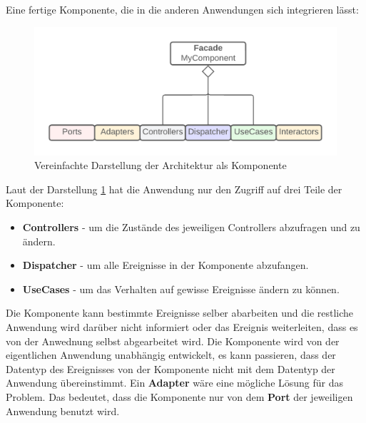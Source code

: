 Eine fertige Komponente, die in die anderen Anwendungen sich integrieren lässt:

\begin{figure}[H]
    \centering
    \includegraphics[width=1\textwidth]{./images/Architecture as Facade.png}
    \caption{Vereinfachte Darstellung der Architektur als Komponente}
    \label{fig:SimpliedArchitectureAsKomponent}
\end{figure}

Laut der Darstellung \ref{fig:SimpliedArchitectureAsKomponent} hat die Anwendung nur den Zugriff auf drei Teile der Komponente:
\begin{itemize}
    \item \textbf{Controllers} - um die Zustände des jeweiligen Controllers abzufragen und zu ändern.
    \item \textbf{Dispatcher} - um alle Ereignisse in der Komponente abzufangen.
    \item \textbf{UseCases} - um das Verhalten auf gewisse Ereignisse ändern zu können.
\end{itemize}

Die Komponente kann bestimmte Ereignisse selber abarbeiten und die restliche Anwendung wird darüber nicht informiert oder
das Ereignis weiterleiten, dass es von der Anwednung selbst abgearbeitet wird.
Die Komponente wird von der eigentlichen Anwendung unabhängig entwickelt, es kann passieren, dass
der Datentyp des Ereignisses von der Komponente nicht mit dem Datentyp der Anwendung übereinstimmt. 
Ein \textbf{Adapter} wäre eine mögliche Lösung für das Problem.
Das bedeutet, dass die Komponente nur von dem \textbf{Port} der jeweiligen Anwendung benutzt wird.

